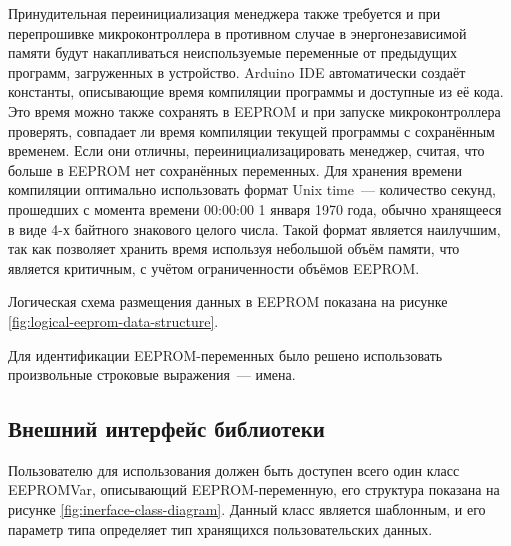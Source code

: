 Принудительная переинициализация менеджера также требуется и при перепрошивке микроконтроллера в противном случае в энергонезависимой памяти будут накапливаться неиспользуемые переменные от предыдущих программ, загруженных в устройство.
Arduino IDE автоматически создаёт константы, описывающие время компиляции программы и доступные из её кода.
Это время можно также сохранять в EEPROM и при запуске микроконтроллера проверять, совпадает ли время компиляции текущей программы с сохранённым временем.
Если они отличны, переинициализацировать менеджер, считая, что больше в EEPROM нет сохранённых переменных.
Для хранения времени компиляции оптимально использовать формат Unix time~--- количество секунд, прошедших с момента времени 00:00:00 1 января 1970 года, обычно хранящееся в виде 4-х байтного знакового целого числа.
Такой формат является наилучшим, так как позволяет хранить время используя небольшой объём памяти, что является критичным, с учётом ограниченности объёмов EEPROM.

Логическая схема размещения данных в EEPROM показана на рисунке \ref{fig:logical-eeprom-data-structure}.

Для идентификации EEPROM-переменных было решено использовать произвольные строковые выражения~--- имена.



\subsection{Внешний интерфейс библиотеки}

Пользователю для использования должен быть доступен всего один класс EEPROMVar, описывающий EEPROM-переменную, его структура показана на рисунке \ref{fig:inerface-class-diagram}.
Данный класс является шаблонным, и его параметр типа определяет тип хранящихся пользовательских данных.

